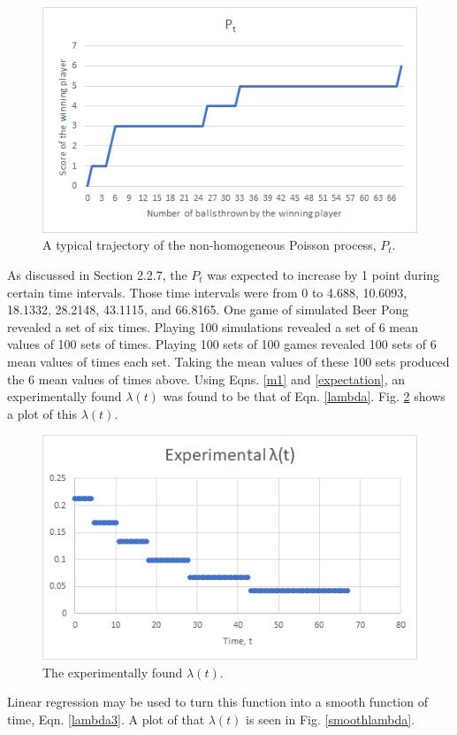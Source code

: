 \documentclass{article}
\begin{document}
\begin{figure}
	\centering
	\includegraphics[width=0.7\linewidth]{P_t}
	\caption{A typical trajectory of the non-homogeneous Poisson process, $P_t$.}
	\label{P_t}
\end{figure}

As discussed in Section 2.2.7, the $P_t$ was expected to increase by 1 point during certain time intervals. Those time intervals were from 0 to 4.688, 10.6093, 18.1332, 28.2148, 43.1115, and 66.8165. One game of simulated Beer Pong revealed a set of six times. Playing 100 simulations revealed a set of 6 mean values of 100 sets of times. Playing 100 sets of 100 games revealed 100 sets of 6 mean values of times each set. Taking the mean values of these 100 sets produced the 6 mean values of times above. Using Eqns. \ref{m1} and \ref{expectation}, an experimentally found $\lambda(t)$ was found to be that of Eqn. \ref{lambda}. Fig. \ref{experimentallambda} shows a plot of this $\lambda(t)$. 

\begin{figure}
	\centering
	\includegraphics[width=0.7\linewidth]{experimentallambda}
	\caption{The experimentally found $\lambda(t)$.}
	\label{experimentallambda}
\end{figure}

Linear regression may be used to turn this function into a smooth function of time, Eqn. \ref{lambda3}. A plot of that $\lambda(t)$ is seen in Fig. \ref{smoothlambda}.
\end{document}
